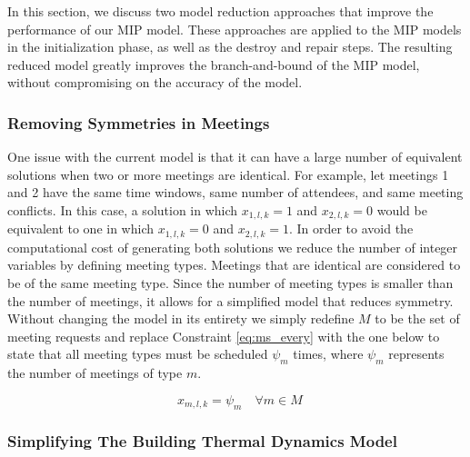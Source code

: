 In this section, we discuss two model reduction approaches that improve the performance of our MIP model. These approaches are applied to the MIP models in the initialization phase, as well as the destroy and repair steps. The resulting reduced model greatly improves the branch-and-bound of the MIP model, without compromising on the accuracy of the model.


\subsubsection{Removing Symmetries in Meetings}

One issue with the current model is that it can have a large number of equivalent solutions when two or more meetings are identical. For example, let meetings 1 and 2 have the same time windows, same number of attendees, and same meeting conflicts. In this case, a solution in which $x_{1,l,k} = 1$ and $x_{2,l,k} = 0$ would be equivalent to one in which $x_{1,l,k} = 0$ and $x_{2,l,k} = 1$. In order to avoid the computational cost of generating both solutions we reduce the number of integer variables by defining meeting types. Meetings that are identical are considered to be of the same meeting type. Since the number of meeting types is smaller than the number of meetings, it allows for a simplified model that reduces symmetry. Without changing the model in its entirety we simply redefine $M$ to be the set of meeting requests and replace Constraint \eqref{eq:ms_every} with the one below to state that all meeting types must be scheduled $\psi_m$ times, where $\psi_m$ represents the number of meetings of type $m$.

\begin{equation} \label{eq:ms_everytype}
\mathop{\sum \limits_{l\in L_m, k \in K_m}} x_{m,l,k}= \psi_m \quad \forall m \in M
\end{equation}


\subsubsection{Simplifying The Building Thermal Dynamics Model}

